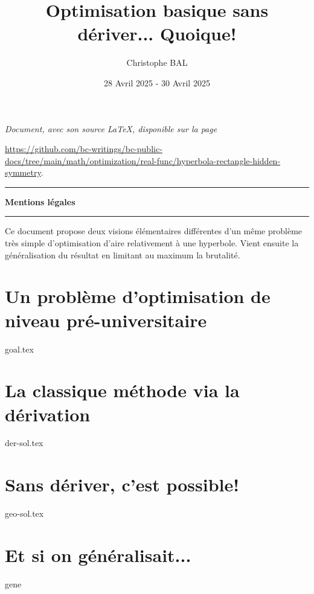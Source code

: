 \documentclass[12pt]{amsart}
\begin{document}
\title{Optimisation basique sans dériver... Quoique!}
\author{Christophe BAL}
\date{28 Avril 2025 - 30 Avril 2025}

\maketitle

\begin{center}
    \itshape
    Document, avec son source \LaTeX, disponible sur la page

    \url{https://github.com/bc-writings/bc-public-docs/tree/main/math/optimization/real-func/hyperbola-rectangle-hidden-symmetry}.
\end{center}


\bigskip


\begin{center}
    \hrule\vspace{.3em}
    {
        \fontsize{1.35em}{1em}\selectfont
        \textbf{Mentions \og légales \fg}
    }

    \vspace{0.45em}
    \doclicenseThis
    \hrule
\end{center}


\bigskip


\setcounter{tocdepth}{2}
\tableofcontents




\newpage

\begin{meta-abstract*}
    Ce document propose deux visions élémentaires différentes d'un même problème très simple d'optimisation d'aire relativement à une hyperbole.
    Vient ensuite la généralisation du résultat en limitant au maximum la brutalité.
\end{meta-abstract*}




\section{Un problème d'optimisation de niveau pré-universitaire}

{goal.tex}





\section{La classique méthode via la dérivation}

{der-sol.tex}




\section{Sans dériver, c'est possible!} \label{exa-geo}

{geo-sol.tex}




\section{Et si on généralisait...}

{gene}
\end{document}
